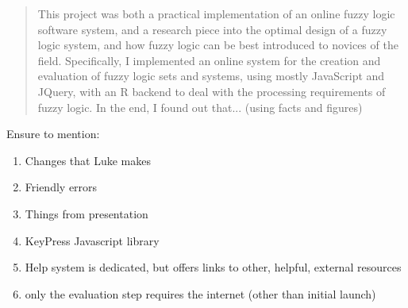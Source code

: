 \documentclass[a4paper,twoside,notitlepage,11pt]{article}
\begin{document}
%
%
%
%

\pagestyle{empty}


%
%
%
%

\newpage
\begin{abstract}
This project was both a practical implementation of an online fuzzy logic software system, and a research piece into the optimal design of a fuzzy logic system, and how fuzzy logic can be best introduced to novices of the field. Specifically, I implemented an online system for the creation and evaluation of fuzzy logic sets and systems, using mostly JavaScript and JQuery, with an R backend to deal with the processing requirements of fuzzy logic.
{\color{red}
In the end, I found out that... (using facts and figures)
}
\end{abstract}

\begin{large}
Ensure to mention:
\begin{enumerate}
	\item Changes that Luke makes
	\item Friendly errors
	\item Things from presentation
	\item KeyPress Javascript library
	\item Help system is dedicated, but offers links to other, helpful, external resources
	\item only the evaluation step requires the internet (other than initial launch)
	
\end{enumerate}


\end{large}

%
%
%
%

\newpage
{}
\tableofcontents

%
%
%
%

\newpage
\pagestyle{plain}
\setcounter{page}{1}












\end{document}

